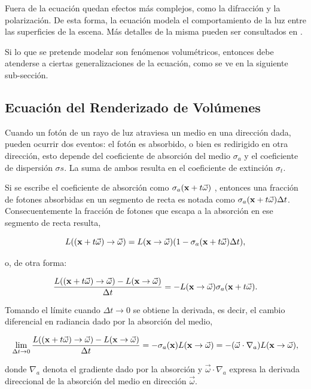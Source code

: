 Fuera de la ecuación quedan efectos más complejos, como la difracción y la polarización.
De esta forma, la ecuación modela el comportamiento de la luz entre las superficies de la escena.
Más detalles de la misma pueden ser consultados en \cite{Kajiya1986}.

Si lo que se pretende modelar son fenómenos volumétricos, entonces debe atenderse a ciertas generalizaciones de la ecuación, como se ve en la siguiente sub-sección.

\subsection{Ecuación del Renderizado de Volúmenes}

Cuando un fotón de un rayo de luz atraviesa un medio en una dirección dada, pueden ocurrir dos eventos: el fotón es absorbido, o bien es redirigido en otra dirección, esto depende del coeficiente de absorción del medio $\sigma_{a}$ y el coeficiente de dispersión $\sigma{s}$.
La suma de ambos resulta en el coeficiente de extinción $\sigma_{t}$.

Si se escribe el coeficiente de absorción como $\sigma_{a}(\bold{x} + t\vec{\omega})$ , entonces una fracción de fotones absorbidas en un segmento de recta es notada como $\sigma_{a}(\bold{x} + t\vec{\omega}) \Delta t$.
Consecuentemente la fracción de fotones que escapa a la absorción en ese segmento de recta resulta,

$$L((\bold{x}+t\vec{\omega}) \rightarrow \vec{\omega}) = L(\bold{x} \rightarrow \vec{\omega}) (1-\sigma_{a}(\bold{x} + t\vec{\omega}) \Delta t),$$

o, de otra forma:

$$\frac{L((\bold{x}+t\vec{\omega}) \rightarrow \vec{\omega}) - L(\bold{x} \rightarrow \vec{\omega}) }{ \Delta t } = - L(\bold{x} \rightarrow \vec{\omega}) \sigma_{a}(\bold{x} + t\vec{\omega}).$$

Tomando el límite cuando $\Delta t \rightarrow 0$ se obtiene la derivada, es decir, el cambio diferencial en radiancia dado por la absorción del medio,

$$\lim_{\Delta t \rightarrow 0} \frac{L((\bold{x}+t\vec{\omega}) \rightarrow \vec{\omega}) - L(\bold{x} \rightarrow \vec{\omega}) }{ \Delta t } = - \sigma_{a}(\bold{x}) L(\bold{x} \rightarrow \vec{\omega})  = -(\vec{\omega} \cdot \nabla_{a}) L(\bold{x} \rightarrow \vec{\omega}),$$

donde $\nabla_{a}$ denota el gradiente dado por la absorción y $ \vec{\omega} \cdot \nabla_{a}$ expresa la derivada direccional de la absorción del medio en dirección $\vec{\omega}$.

